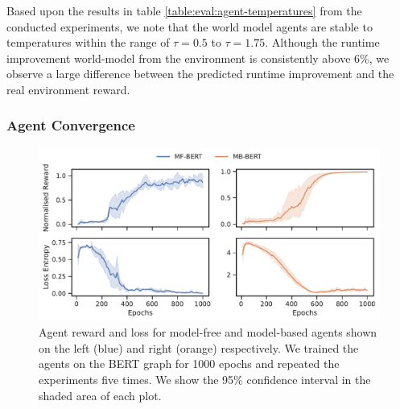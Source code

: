Based upon the results in table \ref{table:eval:agent-temperatures} from the conducted experiments, we note that the world model agents are stable to temperatures within the range of $\tau = 0.5$ to $\tau = 1.75$. Although the runtime improvement world-model from the environment is consistently above 6\%, we observe a large difference between the predicted runtime improvement and the real environment reward.



\subsubsection{Agent Convergence}

\begin{figure}[ht]
  \centering
  \includegraphics[width=1\columnwidth]{sections/5evaluation/images/agent_convergence.pdf}
  \caption[Convergence line plots of MF and MB approaches]{Agent reward and loss for model-free and model-based agents shown on the left (blue) and right (orange) respectively. We trained the agents on the BERT graph for 1000 epochs and repeated the experiments five times. We show the 95\% confidence interval in the shaded area of each plot.}
  \label{fig:eval:agent-mf-mb-convg}
\end{figure}

